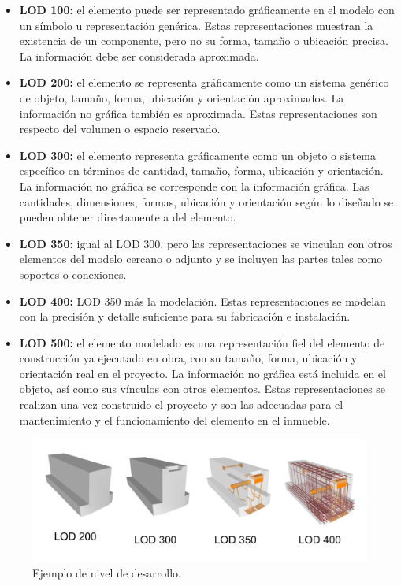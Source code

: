 \begin{itemize}
    \item \textbf{LOD 100:} el elemento puede ser representado gráficamente en el modelo con un símbolo u representación genérica. Estas representaciones muestran la existencia de un componente, pero no su forma, tamaño o ubicación precisa. La información debe ser considerada aproximada.
    \item \textbf{LOD 200:} el elemento se representa gráficamente como un sistema genérico de objeto, tamaño, forma, ubicación y orientación aproximados. La información no gráfica también es aproximada. Estas representaciones son respecto del volumen o espacio reservado.
    \item \textbf{LOD 300:} el elemento representa gráficamente como un objeto o sistema específico en términos de cantidad, tamaño, forma, ubicación y orientación. La información no gráfica se corresponde con la información gráfica. Las cantidades, dimensiones, formas, ubicación y orientación según lo diseñado se pueden obtener directamente a del elemento.
    \item \textbf{LOD 350:} igual al LOD 300, pero las representaciones se vinculan con otros elementos del modelo cercano o adjunto y se incluyen las partes tales como soportes o conexiones.
    \item \textbf{LOD 400:} LOD 350 más la modelación. Estas representaciones se modelan con la precisión y detalle suficiente para su fabricación e instalación.       
    \item \textbf{LOD 500:} el elemento modelado es una representación fiel del elemento de construcción ya ejecutado en obra, con su tamaño, forma, ubicación y orientación real en el proyecto. La información no gráfica está incluida en el objeto, así como sus vínculos con otros elementos. Estas representaciones se realizan una vez construido el proyecto y son las adecuadas para el mantenimiento y el funcionamiento del elemento en el inmueble.
\end{itemize}

\begin{figure}[H]
    \centering
    \includegraphics[width=0.95\linewidth]{images/lod-arch.jpg}
    \caption{Ejemplo de nivel de desarrollo.}
\end{figure}

